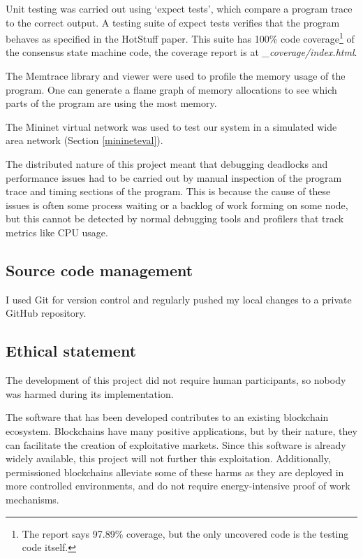 Unit testing was carried out using `expect tests', which compare a program trace to the correct output. A testing suite of expect tests verifies that the program behaves as specified in the HotStuff paper. This suite has 100\% code coverage\footnote{The report says 97.89\% coverage, but the only uncovered code is the testing code itself.} of the consensus state machine code, the coverage report is at \textit{\_coverage/index.html}.

The Memtrace library and viewer \cite{memtrace} were used to profile the memory usage of the program. One can generate a flame graph of memory allocations to see which parts of the program are using the most memory.

The Mininet virtual network \cite{mininet,lantzNetworkLaptopRapid2010} was used to test our system in a simulated wide area network (Section \ref{minineteval}).

The distributed nature of this project meant that debugging deadlocks and performance issues had to be carried out by manual inspection of the program trace and timing sections of the program. This is because the cause of these issues is often some process waiting or a backlog of work forming on some node, but this cannot be detected by normal debugging tools and profilers that track metrics like CPU usage.

\subsection{Source code management}
I used Git for version control and regularly pushed my local changes to a private GitHub repository.

\subsection{Ethical statement}
The development of this project did not require human participants, so nobody was harmed during its implementation.

The software that has been developed contributes to an existing blockchain ecosystem. Blockchains have many positive applications, but by their nature, they can facilitate the creation of exploitative markets. Since this software is already widely available, this project will not further this exploitation. Additionally, permissioned blockchains alleviate some of these harms as they are deployed in more controlled environments, and do not require energy-intensive proof of work mechanisms.